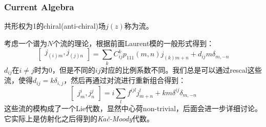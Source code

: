 \subsubsection{Current Algebra}
\begin{definition}
	共形权为1的chiral(anti-chiral)场$j(z)$称为流。
\end{definition}
考虑一个谱为$N$个流的理论，根据前面Laurent模的一般形式得到：
\begin{equation}\label{current}
	\begin{bmatrix}j_{(i)m},j_{(j)n}\end{bmatrix}=\sum_kC_{ij}^kp_{111}(m,n)j_{(k)m+n}+d_{ij}m\delta_{m,-n}
\end{equation}
$d_{ij}$在$i\neq j$时为0，但是不同的$ij$对应的比例系数不同。我们总是可以通过rescal这些流，使得$d_{ij}=k\delta_{i,j}$，然后再通过对流进行重新组合得到：
\begin{equation}
	\boxed{
		\begin{bmatrix}j_m^i,j_n^j\end{bmatrix}=i\sum_lf^{ijl}j_{m+n}^l+km\delta^{ij}\delta_{m,-n}
	}
\end{equation}
这些流的模构成了一个Lie代数，显然中心荷non-trivial，后面会进一步详细讨论。它实际上是仿射化之后得到的{\itshape Ka\v{c}-Moody}代数。
